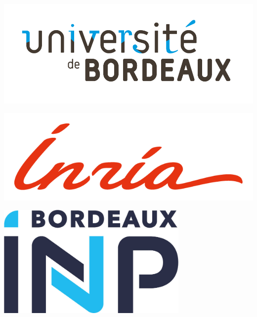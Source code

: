 \newcommand{\BXexam}[5]{#1 \textsc{#2} \dotfill & #3, #4 \dotfill & #5 \\}


\pagestyle{empty}

\begin{titlepage}
    \begin{center}

        \vspace*{-96pt}

        \begin{minipage}[c]{0.3\textwidth}
            \centering
            \includegraphics[width=\textwidth]{images/cover/logo-ub.jpg}
        \end{minipage}
        \hfill
        \begin{minipage}[c]{0.25\textwidth}
            \centering
            \includegraphics[width=\textwidth]{images/cover/logo-inria.png}
        \end{minipage}
        \hfill
        \begin{minipage}[c]{0.2\textwidth}
            \centering
            \includegraphics[width=0.7\textwidth]{images/cover/logo-bdxinp.jpg}
        \end{minipage}
        \vfill
        \vfill
        \vfill
        \vfill


\end{center}
\end{titlepage}
